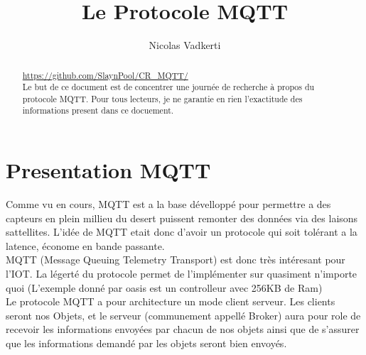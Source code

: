 \documentclass[a4paper,10pt]{article}
\title{Le Protocole MQTT}
\author{Nicolas Vadkerti}
\begin{document}
\maketitle
\begin{abstract}
 

\url{https://github.com/SlaynPool/CR_MQTT/}\\
Le but de ce document est de concentrer une journée de recherche à propos du protocole MQTT. Pour tous lecteurs, je ne garantie en rien l'exactitude des informations present dans ce docuement.
 
 
\end{abstract}



\section{Presentation MQTT}
Comme vu en cours, MQTT est a la base dévelloppé pour permettre a des capteurs en plein millieu du desert puissent remonter des données via des laisons sattellites. L'idée de MQTT etait donc d'avoir un protocole qui soit tolérant a la latence, économe en bande passante.\\
MQTT (Message Queuing Telemetry Transport) est donc très intéresant pour l'IOT. La légerté du protocole permet  de l'implémenter sur quasiment n'importe quoi (L'exemple donné par oasis est un controlleur avec 256KB de Ram)\\
Le protocole MQTT a pour architecture un mode client serveur. Les clients seront nos Objets, et le serveur (communement appellé Broker) aura pour role de recevoir les informations envoyées par chacun de nos objets ainsi que de s'assurer que les informations demandé par les objets seront bien envoyés.
\end{document}
